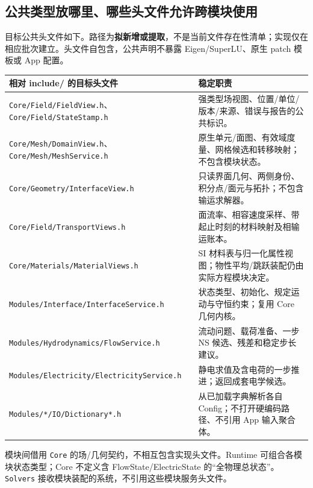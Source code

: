 \documentclass[UTF8,a4paper,11pt,fontset=fandol]{ctexart}
\numberwithin{equation}{section}
\newcommand{\code}[1]{\nolinkurl{#1}}
\begin{document}
\subsection{公共类型放哪里、哪些头文件允许跨模块使用}
目标公共头文件如下。路径为\textbf{拟新增或提取}，不是当前文件存在性清单；实现仅在相应批次建立。头文件自包含，公共声明不暴露 Eigen/SuperLU、原生 patch 模板或 App 配置。
\begin{longtable}{@{}P{.47\textwidth}P{.47\textwidth}@{}}
\toprule 相对 include/ 的目标头文件 & 稳定职责\\\midrule\endhead
\code{Core/Field/FieldView.h}、\code{Core/Field/StateStamp.h} & 强类型场视图、位置/单位/版本/来源、错误与报告的公共标识。\\
\code{Core/Mesh/DomainView.h}、\code{Core/Mesh/MeshService.h} & 原生单元/面图、有效域度量、网格候选和转移映射；不包含模块状态。\\
\code{Core/Geometry/InterfaceView.h} & 只读界面几何、两侧身份、积分点/面元与拓扑；不包含输运求解器。\\
\code{Core/Field/TransportViews.h} & 面流率、相容速度采样、带起止时刻的材料映射及相输运账本。\\
\code{Core/Materials/MaterialViews.h} & SI 材料表与归一化属性视图；物性平均/跳跃装配仍由实际方程模块决定。\\
\code{Modules/Interface/InterfaceService.h} & 状态类型、初始化、规定运动与守恒约束；复用 Core 几何内核。\\
\code{Modules/Hydrodynamics/FlowService.h} & 流动问题、载荷准备、一步 NS 候选、残差和稳定步长建议。\\
\code{Modules/Electricity/ElectricityService.h} & 静电求值及含电荷的一步推进；返回成套电学候选。\\
\code{Modules/*/IO/Dictionary*.h} & 从已加载字典解析各自 Config；不打开硬编码路径、不引用 App 输入聚合体。\\
\bottomrule
\end{longtable}
模块间借用 \code{Core} 的场/几何契约，不相互包含实现头文件。Runtime 可组合各模块状态类型；Core 不定义含 FlowState/ElectricState 的“全物理总状态”。\code{Solvers} 接收模块装配的系统，不引用这些模块服务头文件。
\end{document}
